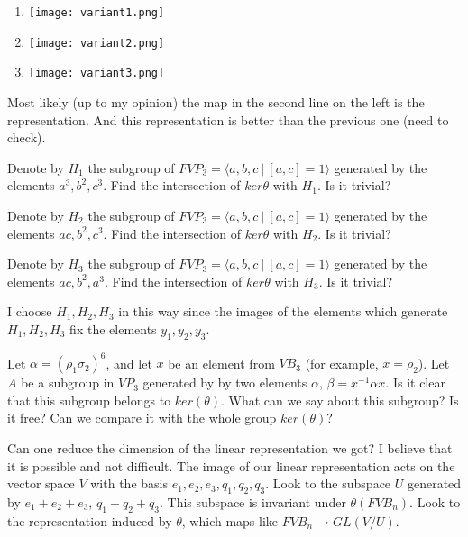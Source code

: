 \documentclass{article}
\begin{document}
\begin{enumerate}

    \item \texttt{[image: variant1.png]}

     \item \texttt{[image: variant2.png]}

      \item \texttt{[image: variant3.png]}

\end{enumerate}

Most likely (up to my opinion) the map in the second line on the left is the representation. And this representation is better than the previous one (need to check).



Denote by $H_1$ the subgroup of $FVP_3=\langle a,b,c~|~[a,c]=1\rangle$ generated by the elements $a^3,b^2,c^3$. Find the intersection of $ker{\theta}$ with $H_1$. Is it trivial?



Denote by $H_2$ the subgroup of $FVP_3=\langle a,b,c~|~[a,c]=1\rangle$ generated by the elements $ac,b^2,c^3$. Find the intersection of $ker{\theta}$ with $H_2$. Is it trivial?



Denote by $H_3$ the subgroup of $FVP_3=\langle a,b,c~|~[a,c]=1\rangle$ generated by the elements $ac,b^2,a^3$. Find the intersection of $ker{\theta}$ with $H_3$. Is it trivial?



I choose $H_1,H_2,H_3$ in this way since the images of the elements which generate $H_1,H_2,H_3$ fix the elements $y_1,y_2,y_3$. 



Let $\alpha=(\rho_1\sigma_2)^6$, and let $x$ be an element from $VB_3$ (for example, $x=\rho_2$). Let $A$ be a subgroup in $VP_3$ generated by by two elements $\alpha$, $\beta=x^{-1}\alpha x$. Is it clear that this subgroup belongs to $ker(\theta)$. What can we say about this subgroup? Is it free? Can we compare it with the whole group $ker(\theta)$?



Can one reduce the dimension of the linear representation we got? I believe that it is possible and not difficult. The image of our linear representation acts on the vector space $V$ with the basis $e_1,e_2,e_3,q_1,q_2,q_3$. Look to the subspace $U$ generated by $e_1+e_2+e_3$, $q_1+q_2+q_3$. This subspace is invariant under $\theta(FVB_n)$. Look to the representation induced by $\theta$, which maps like $FVB_n\to GL(V/U)$.
\end{document}
